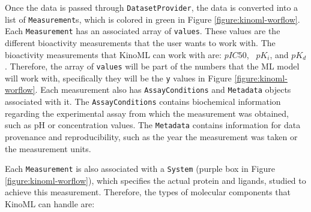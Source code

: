 \documentclass[9pt,lessons, pubversion]{livecoms}
\begin{document}
Once the data is passed through \texttt{DatasetProvider}, the data is converted into a list of \texttt{Measurement}s, which is colored in green in Figure \ref{figure:kinoml-worflow}. Each \texttt{Measurement} has an associated array of \texttt{values}. These values are the different bioactivity measurements that the user wants to work with. The bioactivity measurements that KinoML can work with are: $pIC50$, ~$pK_{i}$, and $pK_{d}$. Therefore, the array of \texttt{values} will be part of the numbers that the ML model will work with, specifically they will be the \texttt{y} values in Figure \ref{figure:kinoml-worflow}. Each measurement also has \texttt{AssayConditions} and \texttt{Metadata} objects associated with it. The \texttt{AssayConditions} contains biochemical information regarding the experimental assay from which the measurement was obtained, such as pH or concentration values. The \texttt{Metadata} contains information for data provenance and reproducibility, such as the year the measurement was taken or the measurement units. 

Each \texttt{Measurement} is also associated with a \texttt{System} (purple box in Figure \ref{figure:kinoml-worflow}), which specifies the actual protein and ligands, studied to achieve this measurement. %
Therefore, the types of molecular components that KinoML can handle are: 
\end{document}
